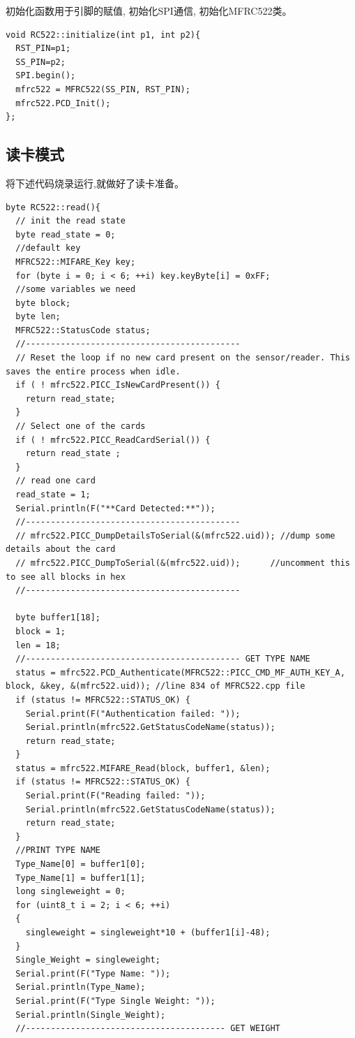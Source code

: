 \documentclass{article}
\begin{document}
初始化函数用于引脚的赋值, 初始化SPI通信, 初始化MFRC522类。
\begin{lstlisting}
void RC522::initialize(int p1, int p2){
  RST_PIN=p1;
  SS_PIN=p2;
  SPI.begin();
  mfrc522 = MFRC522(SS_PIN, RST_PIN);                                           
  mfrc522.PCD_Init();  
};	
\end{lstlisting}

\subsection{读卡模式}
将下述代码烧录运行,就做好了读卡准备。
\begin{lstlisting}
byte RC522::read(){
  // init the read state
  byte read_state = 0;
  //default key 
  MFRC522::MIFARE_Key key;
  for (byte i = 0; i < 6; ++i) key.keyByte[i] = 0xFF;
  //some variables we need
  byte block;
  byte len;
  MFRC522::StatusCode status;
  //-------------------------------------------
  // Reset the loop if no new card present on the sensor/reader. This saves the entire process when idle.
  if ( ! mfrc522.PICC_IsNewCardPresent()) {
    return read_state;
  }
  // Select one of the cards
  if ( ! mfrc522.PICC_ReadCardSerial()) {
    return read_state ;
  }
  // read one card
  read_state = 1;
  Serial.println(F("**Card Detected:**"));
  //-------------------------------------------
  // mfrc522.PICC_DumpDetailsToSerial(&(mfrc522.uid)); //dump some details about the card
  // mfrc522.PICC_DumpToSerial(&(mfrc522.uid));      //uncomment this to see all blocks in hex
  //-------------------------------------------

  byte buffer1[18];
  block = 1;
  len = 18;
  //------------------------------------------- GET TYPE NAME
  status = mfrc522.PCD_Authenticate(MFRC522::PICC_CMD_MF_AUTH_KEY_A, block, &key, &(mfrc522.uid)); //line 834 of MFRC522.cpp file
  if (status != MFRC522::STATUS_OK) {
    Serial.print(F("Authentication failed: "));
    Serial.println(mfrc522.GetStatusCodeName(status));
    return read_state;
  }
  status = mfrc522.MIFARE_Read(block, buffer1, &len);
  if (status != MFRC522::STATUS_OK) {
    Serial.print(F("Reading failed: "));
    Serial.println(mfrc522.GetStatusCodeName(status));
    return read_state;
  }
  //PRINT TYPE NAME
  Type_Name[0] = buffer1[0];
  Type_Name[1] = buffer1[1];
  long singleweight = 0;
  for (uint8_t i = 2; i < 6; ++i)
  {
    singleweight = singleweight*10 + (buffer1[i]-48);
  }
  Single_Weight = singleweight;
  Serial.print(F("Type Name: "));
  Serial.println(Type_Name);
  Serial.print(F("Type Single Weight: "));
  Serial.println(Single_Weight);
  //---------------------------------------- GET WEIGHT


\end{lstlisting}
\end{document}
